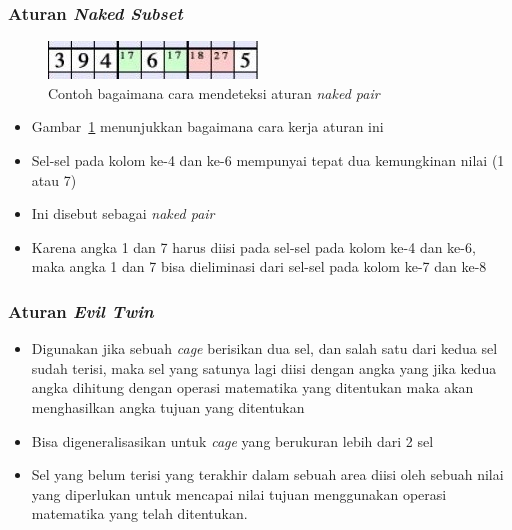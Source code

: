 \documentclass{beamer}
\begin{document}
\begin{frame}
\frametitle{Aturan \textit{Naked Subset}}
\begin{figure}
\centering
\captionsetup{justification=centering}
\includegraphics[scale=1]{Gambar/HybridGenetic2}
\caption[Contoh bagaimana cara mendeteksi aturan  \textit{naked pair}]{Contoh bagaimana cara mendeteksi aturan  \textit{naked pair}}
\label{fig:hybrid2}
\end{figure}
\begin{itemize}
\item Gambar~\ref{fig:hybrid2} menunjukkan bagaimana cara kerja aturan ini
\item Sel-sel pada kolom ke-4 dan ke-6 mempunyai tepat dua kemungkinan nilai (1 atau 7)
\item Ini disebut sebagai \textit{naked pair}
\item Karena angka 1 dan 7 harus diisi pada sel-sel pada kolom ke-4 dan ke-6, maka angka 1 dan 7 bisa dieliminasi dari sel-sel pada kolom ke-7 dan ke-8
\end{itemize}
\end{frame}


\begin{frame}
\frametitle{Aturan \textit{Evil Twin}}
\begin{itemize}
\item Digunakan jika sebuah \textit{cage} berisikan dua sel, dan salah satu dari kedua sel sudah terisi, maka sel yang satunya lagi diisi dengan angka yang jika kedua angka dihitung dengan operasi matematika yang ditentukan maka akan menghasilkan angka tujuan yang ditentukan
\item Bisa digeneralisasikan untuk \textit{cage} yang berukuran lebih dari 2 sel
\item Sel yang belum terisi yang terakhir dalam sebuah area diisi oleh sebuah nilai yang diperlukan untuk mencapai nilai tujuan menggunakan operasi matematika yang telah ditentukan.
\end{itemize}
\end{frame}
\end{document}
